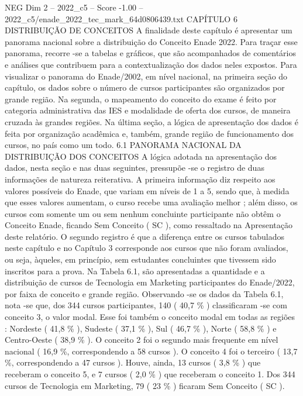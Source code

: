 \begin{textsample}{NEG Dim 2 – 2022\_c5 – Score -1.00 – 2022\_c5/enade\_2022\_tec\_mark\_64d0806439.txt}  \label{ex:f2_neg_217}
CAPÍTULO 6 DISTRIBUIÇÃO DE CONCEITOS A finalidade deste capítulo é apresentar um panorama nacional sobre a distribuição do Conceito Enade 2022.
Para traçar esse panorama, recorre -se a tabelas e gráficos, que são acompanhados de comentários e análises que contribuem para a contextualização dos dados neles expostos.
Para visualizar o panorama do Enade/2002, em nível nacional, na primeira seção do capítulo, os dados sobre o número de cursos participantes são organizados por grande região.
Na segunda, o mapeamento do conceito do exame é feito por categoria administrativa das IES e modalidade de oferta dos cursos, de maneira cruzada às grandes regiões.
Na última seção, a lógica de apresentação dos dados é feita por organização acadêmica e, também, grande região de funcionamento dos cursos, no país como um todo. 6.1 PANORAMA NACIONAL DA DISTRIBUIÇÃO DOS CONCEITOS A lógica adotada na apresentação dos dados, nesta seção e nas duas seguintes, pressupõe -se o registro de duas informações de natureza reiterativa.
A primeira informação diz respeito aos valores possíveis do Enade, que variam em níveis de 1 a 5, sendo que, à medida que esses valores aumentam, o curso recebe uma avaliação melhor ; além disso, os cursos com somente um ou sem nenhum concluinte participante não obtêm o Conceito Enade, ficando Sem Conceito ( SC ), como ressaltado na Apresentação deste relatório.
O segundo registro é que a diferença entre os cursos tabulados neste capítulo e no Capítulo 3 corresponde aos cursos que não foram avaliados, ou seja, àqueles, em princípio, sem estudantes concluintes que tivessem sido inscritos para a prova.
Na Tabela 6.1, são apresentadas a quantidade e a distribuição de cursos de Tecnologia em Marketing participantes do Enade/2022, por faixa de conceito e grande região.
Observando -se os dados da Tabela 6.1, nota -se que, dos 344 cursos participantes, 140 ( 40,7 \% ) classificaram -se com conceito 3, o valor modal.
Esse foi também o conceito modal em todas as regiões : Nordeste ( 41,8 \% ), Sudeste ( 37,1 \% ), Sul ( 46,7 \% ), Norte ( 58,8 \% ) e Centro-Oeste ( 38,9 \% ).
O conceito 2 foi o segundo mais frequente em nível nacional ( 16,9 \%, correspondendo a 58 cursos ).
O conceito 4 foi o terceiro ( 13,7 \%, correspondendo a 47 cursos ).
Houve, ainda, 13 cursos ( 3,8 \% ) que receberam o conceito 5, e 7 cursos ( 2,0 \% ) que receberam o conceito 1.
Dos 344 cursos de Tecnologia em Marketing, 79 ( 23 \% ) ficaram Sem Conceito ( SC ).

\end{textsample}
